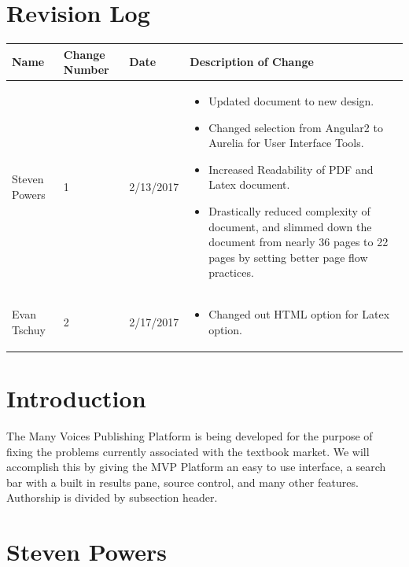 \documentclass[onecolumn, draftclsnofoot,10pt, compsoc]{IEEEtran}
\begin{document}
\section{Revision Log}
\begin{flushleft}
\tablehead{}
\begin{supertabular}{|p{3cm}|p{3cm}|p{3cm}|p{7cm}|}
\hline
Name & Change Number & Date & Description of Change
\\\hline
Steven Powers & 1 & 2/13/2017 & \begin{itemize}
								\item{Updated document to new design.}
								\item{Changed selection from Angular2 to Aurelia for User Interface Tools.}
								\item{Increased Readability of PDF and Latex document.}
								\item{Drastically reduced complexity of document,
									and slimmed down the document from nearly 36 pages to 22
									pages by setting better page flow practices.}
								\end{itemize}
\\ \hline

Evan Tschuy & 2 & 2/17/2017 & \begin{itemize}
								\item{Changed out HTML option for Latex option.}
								\end{itemize}
\\ \hline

\end{supertabular}
\end{flushleft}


\bigskip

\section{Introduction}


\noindent The Many Voices Publishing Platform is being developed for the purpose of fixing the problems currently associated with the textbook market. We will accomplish this by giving the MVP Platform an easy to use interface, a search bar with a built in results pane, source control, and many other features. Authorship is divided by subsection header.


\newpage

\section{Steven Powers}
\end{document}
